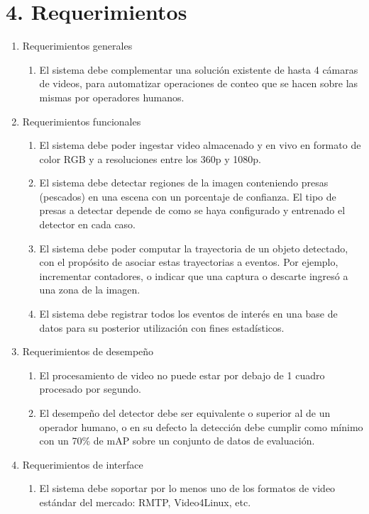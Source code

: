 \documentclass[11pt]{charter}
\begin{document}
\section{4. Requerimientos}
\label{sec:requerimientos}

\begin{enumerate}
\item Requerimientos generales
	\begin{enumerate}
	\item El sistema debe complementar una solución existente de hasta 4 cámaras de videos, para automatizar operaciones de conteo que se hacen sobre las mismas por operadores humanos.
	\end{enumerate}
\item Requerimientos funcionales
	\begin{enumerate}
	\item El sistema debe poder ingestar video almacenado y en vivo en formato de color RGB y a resoluciones entre los 360p y 1080p. 
	\item El sistema debe detectar regiones de la imagen conteniendo presas (pescados) en una escena con un porcentaje de confianza. El tipo de presas a detectar depende de como se haya configurado y entrenado el detector en cada caso.
	\item El sistema debe poder computar la trayectoria de un objeto detectado, con el propósito de asociar estas trayectorias a eventos. Por ejemplo, incrementar contadores, o indicar que una captura o descarte ingresó a una zona de la imagen.
	\item El sistema debe registrar todos los eventos de interés en una base de datos para su posterior utilización con fines estadísticos.
	\end{enumerate}
\item Requerimientos de desempeño	
	\begin{enumerate}
	\item El procesamiento de video no puede estar por debajo de 1 cuadro procesado por segundo.
	\item El desempeño del detector debe ser equivalente o superior al de un operador humano, o en su defecto la detección debe cumplir como mínimo con un 70\% de mAP sobre un conjunto de datos de evaluación.
	\end{enumerate}
\item Requerimientos de interface
	\begin{enumerate}
	\item El sistema debe soportar por lo menos uno de los formatos de video estándar del mercado: RMTP, Video4Linux, etc.

\end{enumerate}
\end{enumerate}
\end{document}
